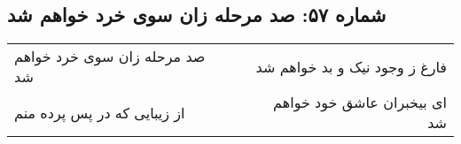\begin{center}
\section*{شماره ۵۷: صد مرحله زان سوی خرد خواهم شد}
\label{sec:057}
\begin{longtable}{l p{0.5cm} r}
صد مرحله زان سوی خرد خواهم شد
&&
فارغ ز وجود نیک و بد خواهم شد
\\
از زیبایی که در پس پرده منم
&&
ای بیخبران عاشق خود خواهم شد
\\
\end{longtable}
\end{center}
